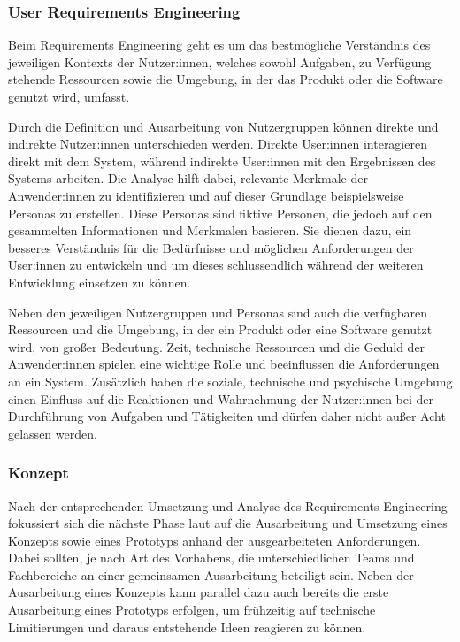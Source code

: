 \documentclass[a4paper,12pt,twoside,numbers=noendperiod]{scrreprt}
\begin{document}
\subsubsection*{User Requirements Engineering}
\label{sub-sub-sec:user-requirements-engineering}
Beim Requirements Engineering geht es um das bestmögliche Verständnis des jeweiligen Kontexts der Nutzer:innen, welches sowohl Aufgaben, zu Verfügung stehende Ressourcen sowie die Umgebung, in der das Produkt oder die Software genutzt wird, umfasst. \cite{frieling_user_2019}

\medskip

Durch die Definition und Ausarbeitung von Nutzergruppen können direkte und indirekte Nutzer:innen unterschieden werden. Direkte User:innen interagieren direkt mit dem System, während indirekte User:innen mit den Ergebnissen des Systems arbeiten. Die Analyse hilft dabei, relevante Merkmale der Anwender:innen zu identifizieren und auf dieser Grundlage beispielsweise Personas zu erstellen. Diese Personas sind fiktive Personen, die jedoch auf den gesammelten Informationen und Merkmalen basieren. Sie dienen dazu, ein besseres Verständnis für die Bedürfnisse und möglichen Anforderungen der User:innen zu entwickeln und um dieses schlussendlich während der weiteren Entwicklung einsetzen zu können. \cite{frieling_user_2019}

\medskip

Neben den jeweiligen Nutzergruppen und Personas sind auch die verfügbaren Ressourcen und die Umgebung, in der ein Produkt oder eine Software genutzt wird, von großer Bedeutung. Zeit, technische Ressourcen und die Geduld der Anwender:innen spielen eine wichtige Rolle und beeinflussen die Anforderungen an ein System. Zusätzlich haben die soziale, technische und psychische Umgebung einen Einfluss auf die Reaktionen und Wahrnehmung der Nutzer:innen bei der Durchführung von Aufgaben und Tätigkeiten und dürfen daher nicht außer Acht gelassen werden. \cite{frieling_user_2019}

\subsubsection*{Konzept}
\label{sub-sub-sec:konzept}

Nach der entsprechenden Umsetzung und Analyse des Requirements Engineering fokussiert sich die nächste Phase laut \cite{frieling_user_2019} auf die Ausarbeitung und Umsetzung eines Konzepts sowie eines Prototyps anhand der ausgearbeiteten Anforderungen. Dabei sollten, je nach Art des Vorhabens, die unterschiedlichen Teams und Fachbereiche an einer gemeinsamen Ausarbeitung beteiligt sein. Neben der Ausarbeitung eines Konzepts kann parallel dazu auch bereits die erste Ausarbeitung eines Prototyps erfolgen, um frühzeitig auf technische Limitierungen und daraus entstehende Ideen reagieren zu können. \cite{frieling_user_2019}
\end{document}
